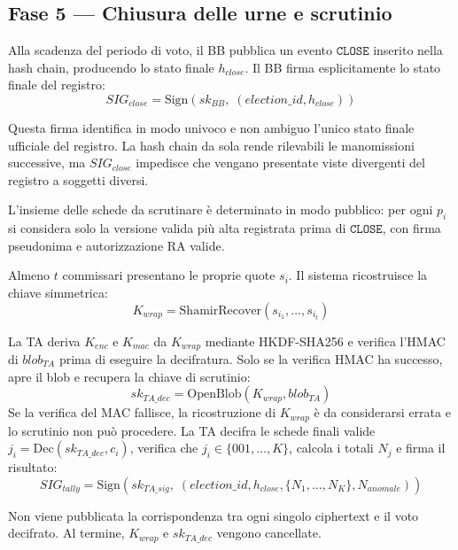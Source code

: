 \documentclass[12pt,a4paper]{article}
\newcommand{\sk}{\mathit{sk}}
\begin{document}
\subsection{Fase 5 --- Chiusura delle urne e scrutinio}

Alla scadenza del periodo di voto, il BB pubblica un evento $\texttt{CLOSE}$ inserito nella hash chain, producendo lo stato finale $h_{\mathit{close}}$. Il BB firma esplicitamente lo stato finale del registro:
\[
\mathit{SIG}_{\mathit{close}} = \mathrm{Sign}(\sk_{\mathit{BB}},\; (\mathit{election\_id}, h_{\mathit{close}}))
\]

Questa firma identifica in modo univoco e non ambiguo l'unico stato finale ufficiale del registro. La hash chain da sola rende rilevabili le manomissioni successive, ma $\mathit{SIG}_{\mathit{close}}$ impedisce che vengano presentate viste divergenti del registro a soggetti diversi.

L'insieme delle schede da scrutinare \`e determinato in modo pubblico: per ogni $p_i$ si considera solo la versione valida pi\`u alta registrata prima di $\texttt{CLOSE}$, con firma pseudonima e autorizzazione RA valide.

Almeno $t$ commissari presentano le proprie quote $s_i$. Il sistema ricostruisce la chiave simmetrica:
\[
K_{\mathit{wrap}} = \mathrm{ShamirRecover}(s_{i_1}, \ldots, s_{i_t})
\]

La TA deriva $K_{\mathit{enc}}$ e $K_{\mathit{mac}}$ da
$K_{\mathit{wrap}}$ mediante HKDF-SHA256 e verifica l'HMAC di
$\mathit{blob}_{\mathit{TA}}$ prima di eseguire la decifratura.
Solo se la verifica HMAC ha successo, apre il blob e recupera
la chiave di scrutinio:
\[
\sk_{\mathit{TA\_dec}} = \mathrm{OpenBlob}(K_{\mathit{wrap}},
\mathit{blob}_{\mathit{TA}})
\]
Se la verifica del MAC fallisce, la ricostruzione di $K_{\mathit{wrap}}$
\`e da considerarsi errata e lo scrutinio non pu\`o procedere.
La TA decifra le schede finali valide $j_i = \mathrm{Dec}(\sk_{\mathit{TA\_dec}}, c_i)$, verifica che $j_i \in \{001, \ldots, K\}$, calcola i totali $N_j$ e firma il risultato:
\[
\mathit{SIG}_{\mathit{tally}} = \mathrm{Sign}(\sk_{\mathit{TA\_sig}},\; (\mathit{election\_id}, h_{\mathit{close}}, \{N_1, \ldots, N_K\}, N_{\mathit{anomale}}))
\]

Non viene pubblicata la corrispondenza tra ogni singolo ciphertext e il voto decifrato. Al termine, $K_{\mathit{wrap}}$ e $\sk_{\mathit{TA\_dec}}$ vengono cancellate.
\end{document}
